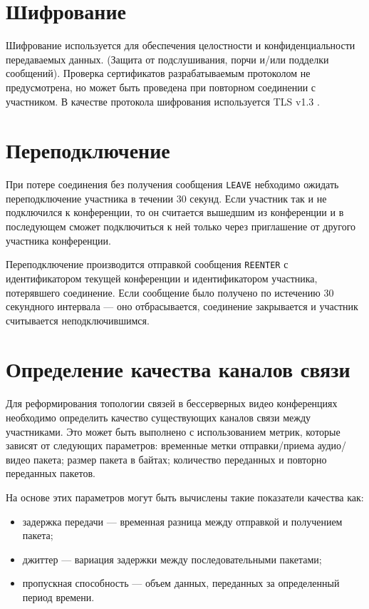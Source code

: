 \section{Шифрование}

Шифрование используется для обеспечения целостности и конфиденциальности передаваемых данных. (Защита от подслушивания, порчи и/или подделки сообщений).
Проверка сертификатов разрабатываемым протоколом не предусмотрена, но может быть проведена при повторном соединении с участником.
В качестве протокола шифрования используется TLS v1.3 \cite{tls}.


\section{Переподключение}

При потере соединения без получения сообщения \texttt{LEAVE} небходимо ожидать переподключение участника в течении 30 секунд. Если участник так и не подключился к конференции, то он считается вышедшим из конференции и в последующем сможет подключиться к ней только через приглашение от другого участника конференции.

Переподключение производится отправкой сообщения \texttt{REENTER} с идентификатором текущей конференции и идентификатором участника, потерявшего соединение. Если сообщение было получено по истечению 30 секундного интервала --- оно отбрасывается, соединение закрывается и участник считывается неподключившимся.

\section{Определение качества каналов связи}

Для реформирования топологии связей в бессерверных видео конференциях необходимо определить качество существующих каналов связи между участниками. Это может быть выполнено с использованием метрик, которые зависят от следующих параметров: временные метки отправки/приема аудио/видео пакета; размер пакета в байтах; количество переданных и повторно переданных пакетов.

На основе этих параметров могут быть вычислены такие показатели качества как:
\begin{itemize}[label=---]
  \item задержка передачи --- временная разница между отправкой и получением пакета;
  \item джиттер --- вариация задержки между последовательными пакетами;
  \item пропускная способность --- объем данных, переданных за определенный период времени.
\end{itemize}
